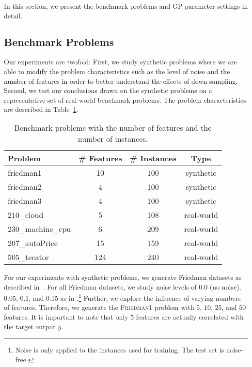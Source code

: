 \documentclass[runningheads]{llncs}
\begin{document}
In this section, we present the benchmark problems and GP  parameter settings in detail.

\subsection{Benchmark Problems}
\label{subsec:benchmark_problems}

Our experiments are twofold: First, we study synthetic problems where we are able to modify the problem characteristics such as the level of noise and the number of features in order to better understand the effects of down-sampling. Second, we test our conclusions drawn on the synthetic problems on a representative set of real-world benchmark problems. The problem characteristics are described in Table~\ref{tab:problems}.

\begin{table}[h]
    \centering
    \caption{Benchmark problems with the number of features and the number of instances.}
    \label{tab:problems}
    \begin{tabular}{l|c|c|c}
    \toprule
Problem & \# Features & \# Instances & Type\\
\midrule
friedman1            & 10   	            & 100 & synthetic\\
friedman2            & 4                    & 100 & synthetic\\
friedman3            & 4                    & 100 & synthetic\\
210\_cloud	         & 5                    & 108 & real-world\\
230\_machine\_cpu    & 6                    & 209 & real-world\\
207\_autoPrice       & 15                   & 159 & real-world\\
505\_tecator         & 124                  & 240 & real-world\\

\bottomrule
    \end{tabular}
\end{table}

For our experiments with synthetic problems, we generate Friedman datasets as described in~\cite{breiman1996bagging, friedman1991multivariate}. For all Friedman datasets, we study noise levels of 0.0 (no noise), 0.05, 0.1, and 0.15 as in \cite{de2024srbench++}.\footnote{Noise is only applied to the instances used for training. The test set is noise-free.}
Further, we explore the influence of varying numbers of features. Therefore, we generate the \textsc{Friedman1} problem with $5$, $10$, $25$, and $50$ features. It is important to note that only $5$ features are actually correlated with the target output $y$. 
\end{document}

